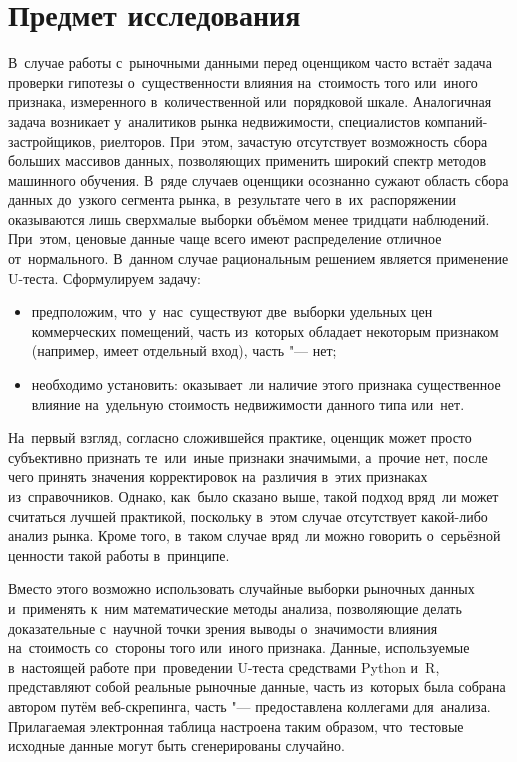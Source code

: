 \documentclass[]{scrreprt}
\begin{document}
\chapter{Предмет исследования}
В~случае работы с~рыночными данными перед оценщиком часто встаёт задача проверки гипотезы о~существенности влияния на~стоимость того или~иного признака, измеренного в~количественной или~порядковой шкале. Аналогичная задача возникает у~аналитиков рынка недвижимости, специалистов компаний-застройщиков, риелторов. При~этом, зачастую отсутствует возможность сбора больших массивов данных, позволяющих применить широкий спектр методов машинного обучения. В~ряде случаев оценщики осознанно сужают область сбора данных до~узкого сегмента рынка, в~результате чего в~их~распоряжении оказываются лишь сверхмалые выборки объёмом менее тридцати наблюдений. При~этом, ценовые данные чаще всего имеют распределение отличное от~нормального. В~данном случае рациональным решением является применение U-теста. Сформулируем задачу:
\begin{itemize}
	\item предположим, что~у~нас~существуют две~выборки удельных цен коммерческих помещений, часть из~которых обладает некоторым признаком (например, имеет отдельный вход), часть "--- нет;
	\item необходимо установить: оказывает~ли наличие этого признака существенное влияние на~удельную стоимость недвижимости данного типа или~нет.
\end{itemize}
На~первый взгляд, согласно сложившейся практике, оценщик может просто субъективно признать те~или~иные признаки значимыми, а~прочие нет, после чего принять значения корректировок на~различия в~этих признаках из~справочников. Однако, как~было сказано выше, такой подход вряд~ли может считаться лучшей практикой, поскольку в~этом случае отсутствует какой-либо анализ рынка. Кроме того, в~таком случае вряд~ли можно говорить о~серьёзной ценности такой работы в~принципе.

Вместо этого возможно использовать случайные выборки рыночных данных и~применять к~ним математические методы анализа, позволяющие делать доказательные с~научной точки зрения выводы о~значимости влияния на~стоимость со~стороны того или~иного признака. Данные, используемые в~настоящей работе при~проведении U-теста средствами Python и~R, представляют собой реальные рыночные данные, часть из~которых была собрана автором путём веб-скрепинга, часть "--- предоставлена коллегами для~анализа. Прилагаемая электронная таблица настроена таким образом, что~тестовые исходные данные могут быть сгенерированы случайно.
\end{document}
